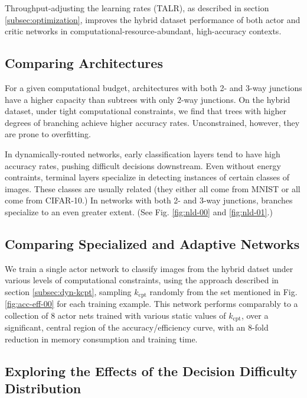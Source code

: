 \documentclass{article}
\begin{document}
  Throughput-adjusting the learning rates (TALR), as described in section \ref*{subsec:optimization}, improves the hybrid dataset performance of both actor and critic networks in computational-resource-abundant, high-accuracy contexts.
  
  \subsection{Comparing Architectures}

  For a given computational budget, architectures with both 2- and 3-way junctions have a higher capacity than subtrees with only 2-way junctions. On the hybrid dataset, under tight computational constraints, we find that trees with higher degrees of branching achieve higher accuracy rates. Unconstrained, however, they are prone to overfitting.
  
  In dynamically-routed networks, early classification layers tend to have high accuracy rates, pushing difficult decisions downstream. Even without energy contraints, terminal layers specialize in detecting instances of certain classes of images. These classes are usually related (they either all come from MNIST or all come from CIFAR-10.) In networks with both 2- and 3-way junctions, branches specialize to an even greater extent. (See Fig. \ref*{fig:nld-00} and \ref*{fig:nld-01}.)
  
  \subsection{Comparing Specialized and Adaptive Networks}
  \label{subsec:multi-purpose-nets}

  We train a single actor network to classify images from the hybrid datset under various levels of computational constraints, using the approach described in section \ref*{subsec:dyn-kcpt}, sampling $k_\text{cpt}$ randomly from the set mentioned in Fig. \ref*{fig:acc-eff-00} for each training example. This network performs comparably to a collection of 8 actor nets trained with various static values of $k_\text{cpt}$, over a significant, central region of the accuracy/efficiency curve, with an 8-fold reduction in memory consumption and training time.

  \subsection{Exploring the Effects of the Decision Difficulty Distribution}
  \label{subsec:diff-dist}
  
\end{document}
